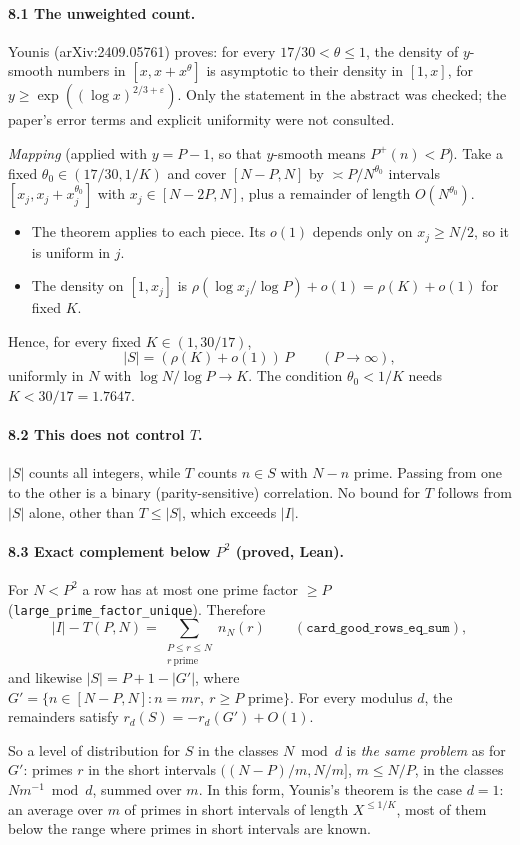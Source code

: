\documentclass[11pt,a4paper]{article}
\theoremstyle{remark}
\begin{document}
\paragraph{8.1 The unweighted count.}
Younis (arXiv:2409.05761) proves: for every $17/30<\theta\le1$, the density of $y$-smooth numbers in
$[x,x+x^\theta]$ is asymptotic to their density in $[1,x]$, for $y\ge\exp((\log x)^{2/3+\varepsilon})$. Only the
statement in the abstract was checked; the paper's error terms and explicit uniformity were not
consulted.

\emph{Mapping} (applied with $y=P-1$, so that $y$-smooth means $P^+(n)<P$). Take a fixed $\theta_0\in(17/30,1/K)$ and cover $[N-P,N]$ by $\asymp P/N^{\theta_0}$ intervals
$[x_j,x_j+x_j^{\theta_0}]$ with $x_j\in[N-2P,N]$, plus a remainder of length $O(N^{\theta_0})$.
\begin{itemize}
\item The theorem applies to each piece. Its $o(1)$ depends only on $x_j\ge N/2$, so it is uniform in $j$.
\item The density on $[1,x_j]$ is $\rho(\log x_j/\log P)+o(1)=\rho(K)+o(1)$ for fixed $K$.
\end{itemize}
Hence, for every fixed $K\in(1,30/17)$,
\[
|S|=(\rho(K)+o(1))\,P\qquad(P\to\infty),
\]
uniformly in $N$ with $\log N/\log P\to K$. The condition $\theta_0<1/K$ needs $K<30/17=1.7647$.

\paragraph{8.2 This does not control $T$.}
$|S|$ counts all integers, while $T$ counts $n\in S$ with $N-n$ prime. Passing from one to the other is a
binary (parity-sensitive) correlation. No bound for $T$ follows from $|S|$ alone, other than $T\le|S|$,
which exceeds $|I|$.

\paragraph{8.3 Exact complement below $P^2$ (proved, Lean).}
For $N<P^2$ a row has at most one prime factor $\ge P$ (\texttt{large\_prime\_factor\_unique}). Therefore
\[
|I|-T(P,N)=\sum_{\substack{P\le r\le N\\ r\ \mathrm{prime}}}n_N(r)\qquad(\texttt{card\_good\_rows\_eq\_sum}),
\]
and likewise $|S|=P+1-|G'|$, where $G'=\{n\in[N-P,N]: n=mr,\ r\ge P\text{ prime}\}$. For every modulus $d$, the
remainders satisfy $r_d(S)=-r_d(G')+O(1)$.

So a level of distribution for $S$ in the classes $N\bmod d$ is \emph{the same problem} as for $G'$: primes
$r$ in the short intervals $((N-P)/m,N/m]$, $m\le N/P$, in the classes $Nm^{-1}\bmod d$, summed over $m$. In this
form, Younis's theorem is the case $d=1$: an average over $m$ of primes in short intervals of length
$X^{\le1/K}$, most of them below the range where primes in short intervals are known.
\end{document}
